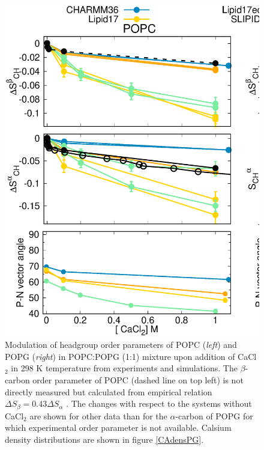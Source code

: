 \documentclass[journal=jpcbfk]{achemso}
\begin{document}
\begin{figure}[]
  \centering
  \includegraphics[width=18.0cm]{./Figs/CHANGESwithCaClPG1PC1.eps}
  \caption{\label{changesWITHCaClPG}
    Modulation of headgroup order parameters of POPC ({\it left}) and POPG ({\it right}) in POPC:POPG (1:1)
    mixture upon addition of CaCl$_2$ in 298 K temperature from experiments \cite{borle85,macdonald87} and simulations.
    The $\beta$-carbon order parameter of POPC (dashed line on top left) is not directly measured but
    calculated from empirical relation $\Delta S_{\beta}=0.43\Delta S_{\alpha}$ \cite{akutsu81}.
    The changes with respect to the systems without CaCl$_2$ are shown for other data than
    for the $\alpha$-carbon of POPG for which experimental order parameter is not available.
    Calsium density distributions are shown in figure \ref{CAdensPG}.
  }
\end{figure}
\end{document}
